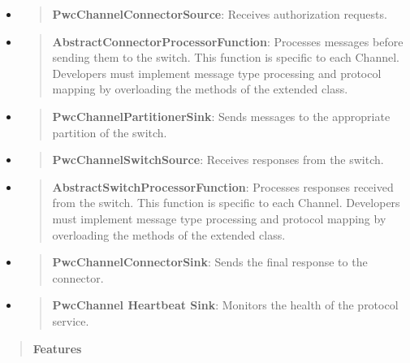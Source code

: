 \documentclass[12pt,a4paper]{report}
\begin{document}
\begin{itemize}
\item
  \begin{quote}
  \textbf{PwcChannelConnectorSource}: Receives authorization requests.
  \end{quote}
\item
  \begin{quote}
  \textbf{AbstractConnectorProcessorFunction}: Processes messages before
  sending them to the switch. This function is specific to each Channel.
  Developers must implement message type processing and protocol mapping
  by overloading the methods of the extended class.
  \end{quote}
\item
  \begin{quote}
  \textbf{PwcChannelPartitionerSink}: Sends messages to the appropriate
  partition of the switch.
  \end{quote}
\item
  \begin{quote}
  \textbf{PwcChannelSwitchSource}: Receives responses from the switch.
  \end{quote}
\item
  \begin{quote}
  \textbf{AbstractSwitchProcessorFunction}: Processes responses received
  from the switch. This function is specific to each Channel. Developers
  must implement message type processing and protocol mapping by
  overloading the methods of the extended class.
  \end{quote}
\item
  \begin{quote}
  \textbf{PwcChannelConnectorSink}: Sends the final response to the
  connector.
  \end{quote}
\item
  \begin{quote}
  \textbf{PwcChannel Heartbeat Sink}: Monitors the health of the
  protocol service.
  \end{quote}
\end{itemize}

\begin{quote}
\textbf{Features}
\end{quote}
\end{document}
